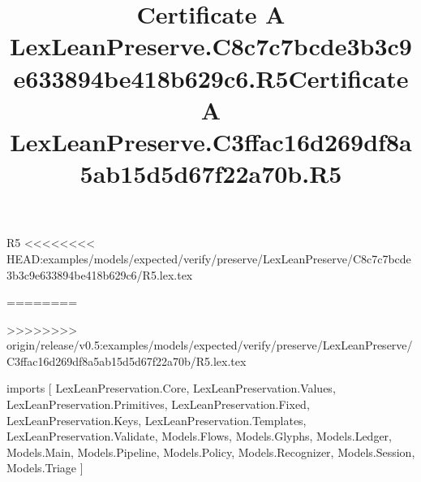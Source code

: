 \begin{lexlean}{R5}
<<<<<<<< HEAD:examples/models/expected/verify/preserve/LexLeanPreserve/C8c7c7bcde3b3c9e633894be418b629c6/R5.lex.tex
\title{Certificate A LexLeanPreserve.C8c7c7bcde3b3c9e633894be418b629c6.R5}
========
\title{Certificate A LexLeanPreserve.C3ffac16d269df8a5ab15d5d67f22a70b.R5}
>>>>>>>> origin/release/v0.5:examples/models/expected/verify/preserve/LexLeanPreserve/C3ffac16d269df8a5ab15d5d67f22a70b/R5.lex.tex
\begin{coremodule}
imports [
  LexLeanPreservation.Core,
  LexLeanPreservation.Values,
  LexLeanPreservation.Primitives,
  LexLeanPreservation.Fixed,
  LexLeanPreservation.Keys,
  LexLeanPreservation.Templates,
  LexLeanPreservation.Validate,
  Models.Flows,
  Models.Glyphs,
  Models.Ledger,
  Models.Main,
  Models.Pipeline,
  Models.Policy,
  Models.Recognizer,
  Models.Session,
  Models.Triage
]


\end{coremodule}
\end{lexlean}
